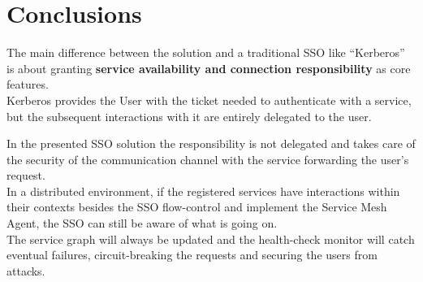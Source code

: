 \documentclass{article}
\begin{document}
\newpage

\section{Conclusions}
The main difference between the solution and a traditional SSO like ``Kerberos''\cite{kerberos} is about granting \textbf{service availability and connection responsibility} as core features.\\
Kerberos provides the User with the ticket needed to authenticate with a service, but the subsequent interactions with it are entirely delegated to the user.
\medskip

In the presented SSO solution the responsibility is not delegated and takes care of the security of the communication channel with the service forwarding the user's request.\\
In a distributed environment, if the registered services have interactions within their contexts besides the SSO flow-control and implement the Service Mesh Agent, the SSO can still be aware of what is going on.\\
The service graph will always be updated and the health-check monitor will catch eventual failures, circuit-breaking the requests and securing the users from attacks.

\newpage



\end{document}
